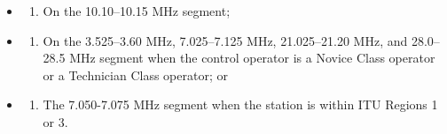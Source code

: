 \documentclass[
  letterpaper,
  DIV=11,
  numbers=noendperiod]{scrreport}
\providecommand{\tightlist}{%
  \setlength{\itemsep}{0pt}\setlength{\parskip}{0pt}}\usepackage{longtable,booktabs,array}
\begin{document}
\begin{itemize}
\item
  \begin{enumerate}
  \def\labelenumi{(\arabic{enumi})}
  \tightlist
  \item
    On the 10.10--10.15 MHz segment;
  \end{enumerate}
\item
  \begin{enumerate}
  \def\labelenumi{(\arabic{enumi})}
  \setcounter{enumi}{1}
  \tightlist
  \item
    On the 3.525--3.60 MHz, 7.025--7.125 MHz, 21.025--21.20 MHz, and
    28.0--28.5 MHz segment when the control operator is a Novice Class
    operator or a Technician Class operator; or
  \end{enumerate}
\item
  \begin{enumerate}
  \def\labelenumi{(\arabic{enumi})}
  \setcounter{enumi}{2}
  \tightlist
  \item
    The 7.050-7.075 MHz segment when the station is within ITU Regions 1
    or 3.
  \end{enumerate}
\end{itemize}
\end{document}
